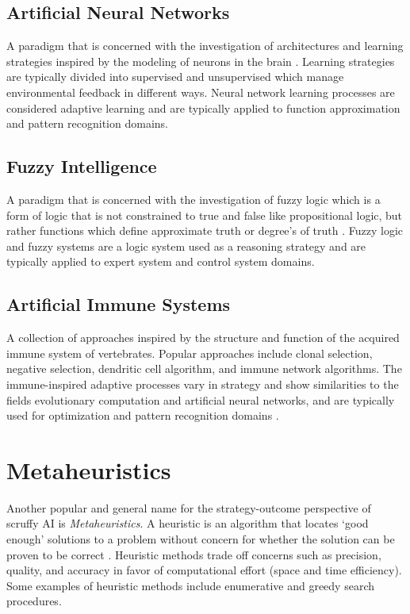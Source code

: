 \documentclass[a4paper, 11pt]{article}
\begin{document}
\subsection{Artificial Neural Networks}
A paradigm that is concerned with the investigation of architectures and learning strategies inspired by the modeling of neurons in the brain \cite{Bishop1995}. Learning strategies are typically divided into supervised and unsupervised which manage environmental feedback in different ways. Neural network learning processes are considered adaptive learning and are typically applied to function approximation and pattern recognition domains.

\subsection{Fuzzy Intelligence}
A paradigm that is concerned with the investigation of fuzzy logic which is a form of logic that is not constrained to true and false like propositional logic, but rather functions which define approximate truth or degree’s of truth \cite{Zadeh1996}. Fuzzy logic and fuzzy systems are a logic system used as a reasoning strategy and are typically applied to expert system and control system domains.

\subsection{Artificial Immune Systems}
A collection of approaches inspired by the structure and function of the acquired immune system of vertebrates. Popular approaches include clonal selection, negative selection, dendritic cell algorithm, and immune network algorithms. The immune-inspired adaptive processes vary in strategy and show similarities to the fields evolutionary computation and artificial neural networks, and are typically used for optimization and pattern recognition domains \cite{Castro2002}.  

% 
% 
\section{Metaheuristics}
\label{sec:metaheuristics}
Another popular and general name for the strategy-outcome perspective of scruffy AI is \emph{Metaheuristics}. 
A heuristic is an algorithm that locates `good enough' solutions to a problem without concern for whether the solution can be proven to be correct \cite{Michalewicz2004}. Heuristic methods trade off concerns such as precision, quality, and accuracy in favor of computational effort (space and time efficiency). Some examples of heuristic methods include enumerative and greedy search procedures.
\end{document}
